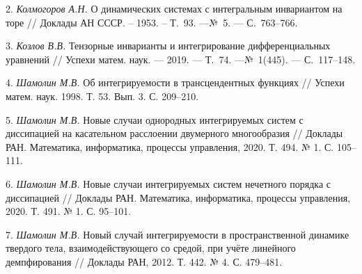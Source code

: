 2. {\it Колмогоров А.Н.} О динамических системах с интегральным инвариантом на торе
// Доклады АН СССР. -- 1953. -- Т.~93. ---№~5. --- С.~763--766.

3. {\it Козлов В.В.} Тензорные инварианты и интегрирование дифференциальных
уравнений // Успехи матем. наук. --- 2019. --- Т.~74. ---№~1(445). --- С.~117--148.

4. {\it Шамолин М.В.} Об интегрируемости в трансцендентных функциях // Успехи матем. наук. 1998. Т. 53. Вып. 3. С. 209–210.

5. {\it Шамолин М.В.} Новые случаи однородных интегрируемых систем с диссипацией на касательном расслоении двумерного многообразия // Доклады РАН. Математика, информатика, процессы управления, 2020. Т. 494. № 1. С. 105–111.

6. {\it Шамолин М.В.} Новые случаи интегрируемых систем нечетного порядка с диссипацией // Доклады РАН. Математика, информатика, процессы управления, 2020. Т. 491. № 1. С. 95–101.

7. {\it Шамолин М.В.} Новый случай интегрируемости в пространственной динамике твердого тела, взаимодействующего со средой, при учёте линейного демпфирования // Доклады РАН, 2012. Т. 442. № 4. С. 479–481.


